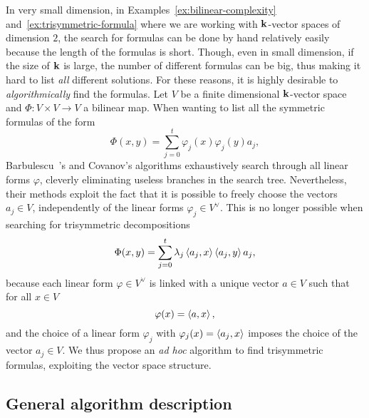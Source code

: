 In very small dimension, \eg in Examples~\ref{ex:bilinear-complexity}
and~\ref{ex:trisymmetric-formula} where we are working with $\mathbf{k}$-vector spaces
of dimension $2$, the search for formulas can be done by hand relatively easily
because the length of the formulas is short. Though, even in small dimension, if
the size of $\mathbf{k}$ is large, the number of different formulas can be
big, thus making it hard to list \emph{all} different solutions. For these
reasons, it is highly desirable to \emph{algorithmically} find the formulas.
Let $V$ be a finite dimensional $\mathbf{k}$-vector space and $\Phi:V\times V\to V$ a bilinear map.
When wanting to list all the symmetric formulas of the form
\[
  \Phi(x, y) = \sum_{j=0}^t\varphi_j(x)\varphi_j(y)a_j,
\]
Barbulescu~\etal\!\!\!'s and Covanov's algorithms exhaustively search through
all linear forms $\varphi$, cleverly eliminating useless branches in the search
tree. Nevertheless, their methods exploit the fact that it is possible to freely
choose the vectors $a_j\in V$, independently of the linear forms $\varphi_j\in
V^\vee$. This is
no longer possible when searching for trisymmetric decompositions
\[
  \Phi(x, y) = \sum_{j=0}^t\lambda_j\left\langle a_j,x\right\rangle\left\langle a_j,y\right\rangle a_j,
\]
because each
linear form $\varphi\in V^\vee$ is linked with a unique vector $a\in V$ such
that for all $x\in V$
\[
  \varphi(x) = \left\langle a,x\right\rangle,
\]
and the choice of a linear form $\varphi_j$ with $\varphi_j(x)=\left\langle a_j,x\right\rangle$
imposes the choice of the vector $a_j\in V$. We thus propose an \emph{ad hoc}
algorithm to find trisymmetric formulas, exploiting the vector space structure.

\subsection{General algorithm description}
\label{sec:general-algorithm}


